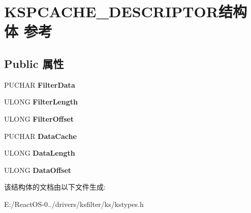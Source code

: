 \hypertarget{struct_k_s_p_c_a_c_h_e___d_e_s_c_r_i_p_t_o_r}{}\section{K\+S\+P\+C\+A\+C\+H\+E\+\_\+\+D\+E\+S\+C\+R\+I\+P\+T\+O\+R结构体 参考}
\label{struct_k_s_p_c_a_c_h_e___d_e_s_c_r_i_p_t_o_r}
\subsection*{Public 属性}
\begin{DoxyCompactItemize}
\item 
\mbox{\label{struct_k_s_p_c_a_c_h_e___d_e_s_c_r_i_p_t_o_r_a838c59ee185d4a5df36a0238bcb63525}} 
P\+U\+C\+H\+AR {\bfseries Filter\+Data}
\item 
\mbox{\label{struct_k_s_p_c_a_c_h_e___d_e_s_c_r_i_p_t_o_r_a4c1e47a95ae6a1a146230d0c4554ec73}} 
U\+L\+O\+NG {\bfseries Filter\+Length}
\item 
\mbox{\label{struct_k_s_p_c_a_c_h_e___d_e_s_c_r_i_p_t_o_r_aaeec19db90e5f635fa6dbf2aab82e183}} 
U\+L\+O\+NG {\bfseries Filter\+Offset}
\item 
\mbox{\label{struct_k_s_p_c_a_c_h_e___d_e_s_c_r_i_p_t_o_r_a20140d8fd86c3fcb1da831c1971dc0cf}} 
P\+U\+C\+H\+AR {\bfseries Data\+Cache}
\item 
\mbox{\label{struct_k_s_p_c_a_c_h_e___d_e_s_c_r_i_p_t_o_r_aaa1738f2fdefba4c27a907da75d43074}} 
U\+L\+O\+NG {\bfseries Data\+Length}
\item 
\mbox{\label{struct_k_s_p_c_a_c_h_e___d_e_s_c_r_i_p_t_o_r_a99c703051cf4bd2d75e27115b2e58e25}} 
U\+L\+O\+NG {\bfseries Data\+Offset}
\end{DoxyCompactItemize}


该结构体的文档由以下文件生成\+:\begin{DoxyCompactItemize}
\item 
E\+:/\+React\+O\+S-\/0../drivers/ksfilter/ks/kstypes.\+h\end{DoxyCompactItemize}
